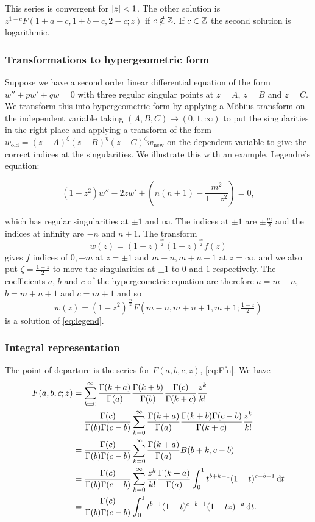\documentclass{notes}
\theoremstyle{plain}
\begin{document}
This series is convergent for $\left|z\right| < 1$.  The other solution
is $z^{1-c} F(1 + a - c,1+b-c,2-c;z)$ if $c \notin \mathbb{Z}$.  If
$c \in \mathbb{Z}$ the second solution is logarithmic.

\subsubsection*{Transformations to hypergeometric form}

Suppose we have a second order linear differential equation of the
form $w'' + p w' + q w = 0$ with three regular singular points at $z=A$,
$z=B$ and $z=C$.  We transform this into hypergeometric form by
applying a M\"obius transform on the independent variable taking
$(A,B,C) \mapsto (0,1,\infty)$ to put the singularities in the right place
and applying a transform of the form $w_{\text{old}} = (z-A)^\xi (z-B)^\eta
(z-C)^\zeta w_{\text{new}}$ on the dependent variable to give the correct
indices at the singularities.  We illustrate this with an example, Legendre's
equation:

\begin{equation}\label{eq:legend}
(1-z^2) w'' - 2 z w' + \left( n(n+1) - \frac{m^2}{1-z^2} \right) = 0,
\end{equation}

which has regular singularities at $\pm 1$ and $\infty$.  The indices
at $\pm 1$ are $\pm \frac{m}{2}$ and the indices at infinity are $-n$
and $n+1$.  The transform
\[
w(z) = (1-z)^{\frac{m}{2}} (1+z)^{\frac{m}{2}} f(z)
\]
gives $f$ indices of $0,-m$ at $z = \pm 1$ and $m-n,m+n+1$ at $z=\infty$.
and we also put $\zeta = \frac{1-z}{2}$ to move the singularities at $\pm 1$
to $0$ and $1$ respectively.
The coefficients $a$, $b$ and $c$ of the hypergeometric equation
are therefore $a=m-n$, $b=m+n+1$ and $c=m+1$ and so
\[
w(z) = \left(1-z^2\right)^{\frac{m}{2}} F(m-n,m+n+1,m+1;\tfrac{1-z}{2})
\]
is a solution of \eqref{eq:legend}.

\subsubsection*{Integral representation}

The point of departure is the series for $F(a,b,c;z)$, \eqref{eq:Ffn}.  We
have
\begin{align*}
F(a,b,c;z) &= \sum_{k=0}^\infty \frac{\Gamma(k+a)}{\Gamma(a)}
\frac{\Gamma(k+b)}{\Gamma(b)} \frac{\Gamma(c)}{\Gamma(k+c)} \frac{z^k}{k!} \\
&= \frac{\Gamma(c)}{\Gamma(b) \Gamma(c-b)}
\sum_{k=0}^\infty \frac{\Gamma(k+a)}{\Gamma(a)} \frac{\Gamma(k+b) \Gamma(c-b)}
{\Gamma(k+c)} \frac{z^k}{k!} \\
&= \frac{\Gamma(c)}{\Gamma(b) \Gamma(c-b)}
\sum_{k=0}^\infty \frac{\Gamma(k+a)}{\Gamma(a)} B(b+k,c-b) \\
&= \frac{\Gamma(c)}{\Gamma(b) \Gamma(c-b)} \sum_{k=0}^\infty
\frac{z^k}{k!}  \frac{\Gamma(k+a)}{\Gamma(a)}
\int_0^1 t^{b+k-1} (1-t)^{c-b-1}\, \mathrm{d} t\\
&= \frac{\Gamma(c)}{\Gamma(b) \Gamma(c-b)} \int_0^1
t^{b-1} (1-t)^{c-b-1} (1-tz)^{-a}\, \mathrm{d} t.
\end{align*}
\end{document}
